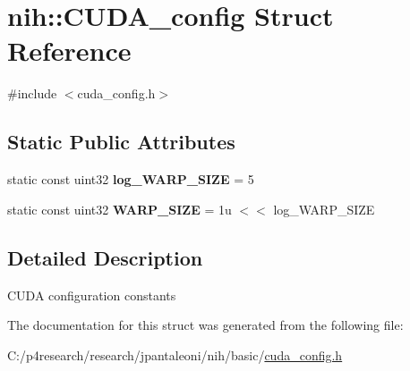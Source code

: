 \hypertarget{structnih_1_1_c_u_d_a__config}{
\section{nih\-:\-:\-C\-U\-D\-A\-\_\-config \-Struct \-Reference}
\label{structnih_1_1_c_u_d_a__config}
}


{\ttfamily \#include $<$cuda\-\_\-config.\-h$>$}

\subsection*{\-Static \-Public \-Attributes}
\begin{DoxyCompactItemize}
\item 
\hypertarget{structnih_1_1_c_u_d_a__config_a06622a5887b68908d0d23c6da620d32b}{
static const uint32 {\bfseries log\-\_\-\-W\-A\-R\-P\-\_\-\-S\-I\-Z\-E} = 5}
\label{structnih_1_1_c_u_d_a__config_a06622a5887b68908d0d23c6da620d32b}

\item 
\hypertarget{structnih_1_1_c_u_d_a__config_a913868a246ecaeb29dac5cb2ba37a9b3}{
static const uint32 {\bfseries \-W\-A\-R\-P\-\_\-\-S\-I\-Z\-E} = 1u $<$$<$ log\-\_\-\-W\-A\-R\-P\-\_\-\-S\-I\-Z\-E}
\label{structnih_1_1_c_u_d_a__config_a913868a246ecaeb29dac5cb2ba37a9b3}

\end{DoxyCompactItemize}


\subsection{\-Detailed \-Description}
\-C\-U\-D\-A configuration constants 

\-The documentation for this struct was generated from the following file\-:\begin{DoxyCompactItemize}
\item 
\-C\-:/p4research/research/jpantaleoni/nih/basic/\hyperlink{cuda__config_8h}{cuda\-\_\-config.\-h}\end{DoxyCompactItemize}
